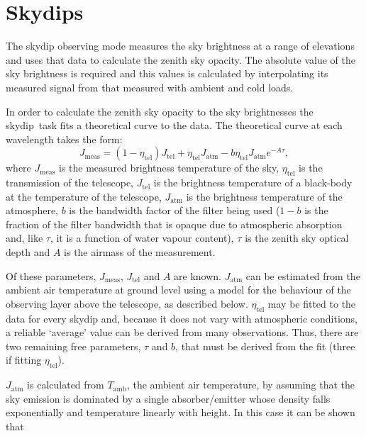 \documentclass[twoside,11pt]{article}
\newcommand{\task}[1]{{\sf #1}}
\newcommand{\skydip}{\htmlref{\task{skydip}}{SKYDIP}}
\newcommand{\htmlref}[2]{#1}
\newcommand{\xlabel}[1]{}
\renewcommand{\_}{\texttt{\symbol{95}}}
\begin{document}
\section{\xlabel{skydips}Skydips\label{skydips}}

The skydip observing mode measures the sky brightness at a range of elevations
and uses that data to calculate the zenith sky opacity. The absolute 
value of the sky brightness is required and this values 
is calculated by interpolating its measured signal from that measured with
ambient and cold loads.

In order to calculate the zenith sky opacity to the sky brightnesses
the \skydip\ task fits a theoretical curve to the data. The theoretical
curve at each wavelength takes the form:
\begin{equation}
J_\mathrm{meas} = (1 - \eta_\mathrm{tel}) J_\mathrm{tel} +
                   \eta_\mathrm{tel} J_\mathrm{atm} -
                   b  \eta_\mathrm{tel} J_\mathrm{atm} e^{-A\tau},
\end{equation}
where $J_\mathrm{meas}$ is the measured brightness temperature of the 
sky, $\eta_\mathrm{tel}$ is the transmission of the telescope, 
$J_\mathrm{tel}$ is the brightness temperature of a black-body at the
temperature of the telescope, $J_\mathrm{atm}$ is the brightness 
temperature of the atmosphere, $b$ is the bandwidth factor of the filter 
being used ($1-b$ is the fraction of the filter bandwidth that is opaque
due to atmospheric absorption and, like $\tau$, it is a function of water
vapour content), $\tau$ is the zenith sky optical depth and $A$ is the
airmass of the measurement.

Of these parameters, $J_\mathrm{meas}$, $J_\mathrm{tel}$  and $A$ are known.
$J_\mathrm{atm}$ can be estimated from the ambient air temperature at ground
level using a model for the behaviour of the observing layer above the
telescope, as described below. $\eta_\mathrm{tel}$ may be fitted to the data
for every skydip and, because it does not vary with atmospheric conditions, a
reliable `average' value can be derived from many observations. Thus, there
are two remaining free parameters, $\tau$ and $b$, that must be derived
from the fit (three if fitting $\eta_\mathrm{tel}$).

$J_\mathrm{atm}$ is calculated from $T_\mathrm{amb}$, the ambient air
temperature, by assuming that the sky emission is dominated by a single
absorber/emitter whose density falls exponentially and temperature linearly
with height. In this case it can be shown that
\end{document}
